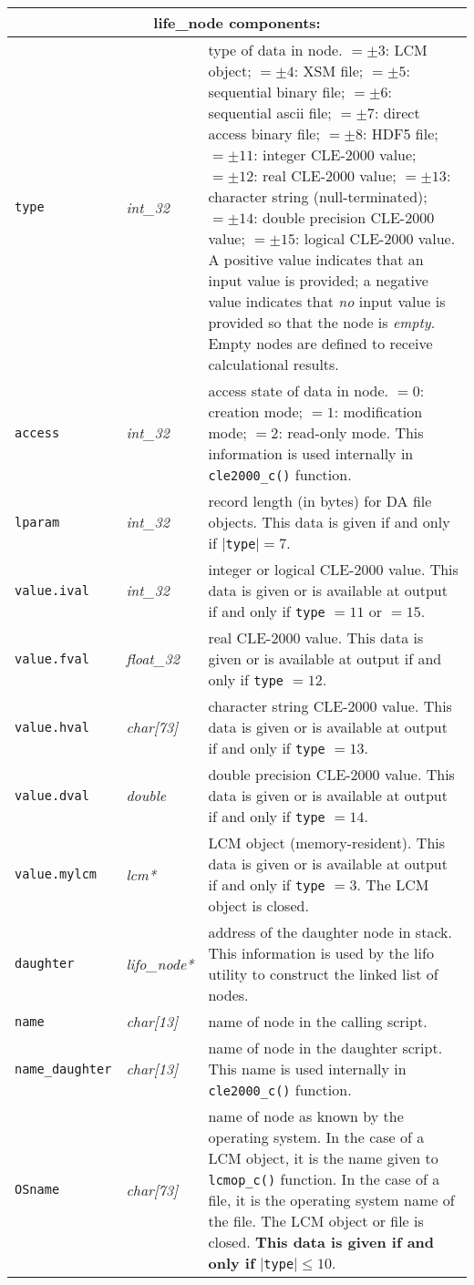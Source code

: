 \vskip 0.8cm

\noindent
\begin{tabular}{|p{2.4cm}|p{1.6cm}|p{10.5cm}|}
\hline
\multicolumn{3}{|c|}{\bf life\_node components:} \\
\hline
{\tt type} & {\it int\_32} & type of data in node.
$=\pm 3$: LCM object;
$=\pm 4$: XSM file;
$=\pm 5$: sequential binary file;
$=\pm 6$: sequential ascii file;
$=\pm 7$: direct access binary file;
$=\pm 8$: HDF5 file;
$=\pm 11$: integer CLE-2000 value;
$=\pm 12$: real CLE-2000 value;
$=\pm 13$: character string (null-terminated);
$=\pm 14$: double precision CLE-2000 value;
$=\pm 15$: logical CLE-2000 value.
A positive value indicates that an input value is provided; a negative value indicates that {\sl no} input value is provided
so that the node is {\sl empty}. Empty nodes are defined to receive calculational results.
\\
\hline
{\tt access} & {\it int\_32} & access state of data in node. 
$= 0$: creation mode;
$= 1$: modification mode;
$= 2$: read-only mode.
This information is used internally in {\tt cle2000\_c()} function.
\\
\hline
{\tt lparam} & {\it int\_32} & record length (in bytes) for DA file objects.  This data is given if and only if $|${\tt type}$| = 7$.\\
\hline
{\tt value.ival} & {\it int\_32} & integer or logical CLE-2000 value. This data is given or is available at output if and only if {\tt type} $= 11$ or $=15$.\\
\hline
{\tt value.fval} & {\it float\_32} & real CLE-2000 value. This data is given or is available at output if and only if {\tt type} $= 12$.\\
\hline
{\tt value.hval} & {\it char[73]} & character string CLE-2000 value. This data is given or is available at output if and only if {\tt type} $= 13$.\\
\hline
{\tt value.dval} & {\it double} & double precision CLE-2000 value. This data is given or is available at output if and only if {\tt type} $= 14$.\\
\hline
{\tt value.mylcm} & {\it lcm*} & LCM object (memory-resident). This data is given or is available at output if and only if {\tt type} $= 3$. The LCM object is closed.\\
\hline
{\tt daughter} & {\it lifo\_node*} & address of the daughter node in stack. This information is used by the lifo utility to construct the linked list of nodes.\\
\hline
{\tt name} & {\it char[13]} & name of node in the calling script.\\
\hline
{\tt name\_daughter} & {\it char[13]} & name of node in the daughter script. This name is used internally in {\tt cle2000\_c()} function.\\
\hline
{\tt OSname} & {\it char[73]} & name of node as known by the operating system. In the case of a LCM object, it is the name given to {\tt lcmop\_c()} function. In the case of a file, it is the operating system name of the file. The LCM object or file is closed. {\bf This data is given if and only if} $|${\tt type}$| \le 10$.\\
\hline
\end{tabular}

